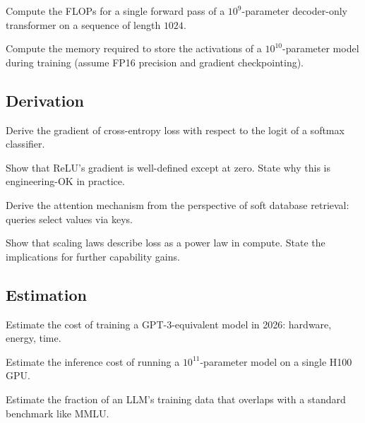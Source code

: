 \begin{exercise}
Compute the FLOPs for a single forward pass of a $10^9$-parameter decoder-only transformer on a sequence of length $1024$.
\end{exercise}

\begin{exercise}
Compute the memory required to store the activations of a $10^{10}$-parameter model during training (assume FP16 precision and gradient checkpointing).
\end{exercise}

\subsection*{Derivation}

\begin{exercise}
Derive the gradient of cross-entropy loss with respect to the logit of a softmax classifier.
\end{exercise}

\begin{exercise}
Show that ReLU's gradient is well-defined except at zero. State why this is engineering-OK in practice.
\end{exercise}

\begin{exercise}
Derive the attention mechanism from the perspective of soft database retrieval: queries select values via keys.
\end{exercise}

\begin{exercise}
Show that scaling laws describe loss as a power law in compute. State the implications for further capability gains.
\end{exercise}

\subsection*{Estimation}

\begin{exercise}
Estimate the cost of training a GPT-3-equivalent model in 2026: hardware, energy, time.
\end{exercise}

\begin{exercise}
Estimate the inference cost of running a $10^{11}$-parameter model on a single H100 GPU.
\end{exercise}

\begin{exercise}
Estimate the fraction of an LLM's training data that overlaps with a standard benchmark like MMLU.
\end{exercise}


